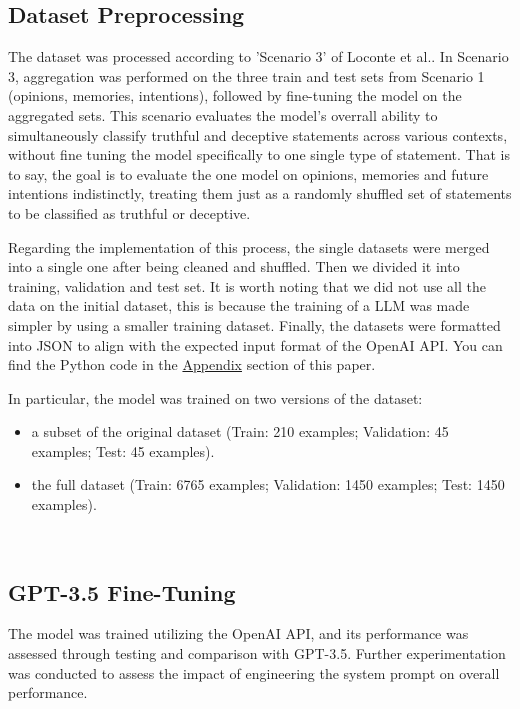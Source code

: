 \documentclass[10pt,twocolumn,letterpaper]{article}
\begin{document}
\subsection{Dataset Preprocessing}


The dataset was processed according to 'Scenario 3' of Loconte et al.\cite{Loconte}.
In Scenario 3, aggregation was performed on the three train and test sets from Scenario 1 (opinions, memories, intentions), followed by fine-tuning the model on the aggregated sets. 
This scenario evaluates the model's overrall ability to simultaneously classify truthful and deceptive statements across various contexts, without fine tuning the model
specifically to one single type of statement. That is to say, the goal is to evaluate the one model on opinions, memories and future intentions indistinctly, treating them just as a randomly shuffled
set of statements to be classified as truthful or deceptive.

Regarding the implementation of this process, the single datasets were merged into a single one after being cleaned and shuffled. Then we divided it into training, validation and test set.
It is worth noting that we did not use all the data on the initial dataset, this is because the training of a LLM was made simpler by using a smaller training dataset.
Finally, the datasets were formatted into JSON to align with the expected input format of the OpenAI API. You can find the Python code in the \hyperref[sec:appendix]{Appendix} section of this paper.

In particular, the model was trained on two versions of the dataset:

\begin{itemize}
    \item a subset of the original dataset (Train: 210 examples; Validation: 45 examples; Test: 45 examples).
    \item the full dataset (Train: 6765 examples; Validation: 1450 examples; Test: 1450 examples).
\end{itemize} \\

\subsection{GPT-3.5 Fine-Tuning}
The model was trained utilizing the OpenAI API, and its performance was assessed through 
testing and comparison with GPT-3.5. Further experimentation was conducted to assess 
the impact of engineering the system prompt on overall performance.
\end{document}
